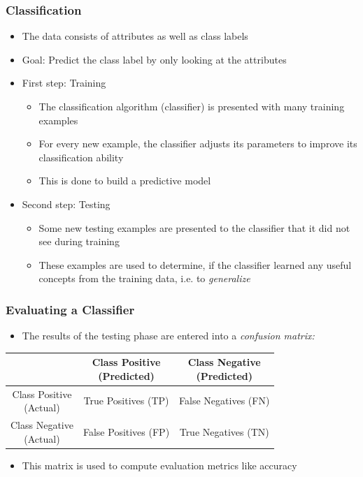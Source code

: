 \begin{frame}
  \frametitle{Classification}
  \begin{itemize}
    \item The data consists of attributes as well as class labels
    \item Goal: Predict the class label by only looking at the attributes
    \item First step: Training
      \begin{itemize}
        \item The classification algorithm (classifier) is presented
          with many training examples
        \item For every new example, the classifier adjusts its
          parameters to improve its classification ability
        \item This is done to build a predictive model
      \end{itemize}
    \item Second step: Testing
      \begin{itemize}
        \item Some new testing examples are presented to the
          classifier that it did not see during training
        \item These examples are used to determine, if the classifier
          learned any useful concepts from the training data, i.e. to
          \textit{generalize}
      \end{itemize}
  \end{itemize}
\end{frame}

\begin{frame}
  \frametitle{Evaluating a Classifier}
  \begin{itemize}
    \item The results of the testing phase are entered into a
      \textit{confusion matrix:}
  \end{itemize}
  \begin{table}[h]
  \centering
  \renewcommand\theadfont{\bfseries}
  \begin{tabular}{|c|c|c|}
    \hline
    & \thead{Class Positive\\(Predicted)} & \thead{Class Negative\\(Predicted)} \\
    \hline
    \thead{Class Positive\\(Actual)} & True Positives (TP) & False
    Negatives (FN) \\
    \hline
    \thead{Class Negative\\(Actual)} & False Positives (FP) & True
    Negatives (TN) \\
    \hline
  \end{tabular}
  \end{table}
  \begin{itemize}
    \item This matrix is used to compute evaluation metrics like accuracy
  \end{itemize}
\end{frame}

